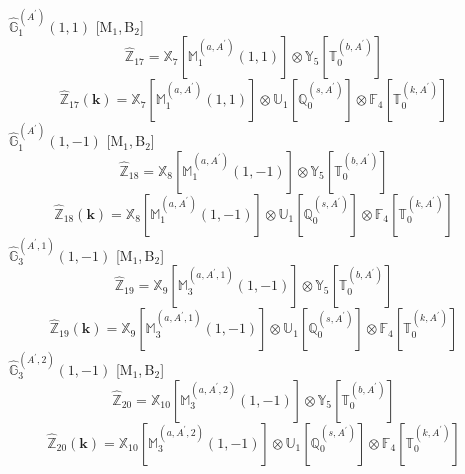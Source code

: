 \documentclass[fleqn,10pt,landscape]{article}
\begin{document}
\begin{itemize}
\begin{dmath*}
\end{dmath*}
\vspace{4mm}
\noindent {} $\,\,\,\hat{\mathbb{G}}_{1}^{(A^{\prime})}(1,1)$ [M$_{1}$,\,B$_{2}$]
\begin{dmath*}
\hat{\mathbb{Z}}_{17}=\mathbb{X}_{7}[\mathbb{M}_{1}^{(a,A^{\prime})}(1,1)] \otimes\mathbb{Y}_{5}[\mathbb{T}_{0}^{(b,A^{\prime})}]
\end{dmath*}
\begin{dmath*}
\hat{\mathbb{Z}}_{17}(\bm{k})=\mathbb{X}_{7}[\mathbb{M}_{1}^{(a,A^{\prime})}(1,1)] \otimes\mathbb{U}_{1}[\mathbb{Q}_{0}^{(s,A^{\prime})}] \otimes\mathbb{F}_{4}[\mathbb{T}_{0}^{(k,A^{\prime})}]
\end{dmath*}
\vspace{4mm}
\noindent {} $\,\,\,\hat{\mathbb{G}}_{1}^{(A^{\prime})}(1,-1)$ [M$_{1}$,\,B$_{2}$]
\begin{dmath*}
\hat{\mathbb{Z}}_{18}=\mathbb{X}_{8}[\mathbb{M}_{1}^{(a,A^{\prime})}(1,-1)] \otimes\mathbb{Y}_{5}[\mathbb{T}_{0}^{(b,A^{\prime})}]
\end{dmath*}
\begin{dmath*}
\hat{\mathbb{Z}}_{18}(\bm{k})=\mathbb{X}_{8}[\mathbb{M}_{1}^{(a,A^{\prime})}(1,-1)] \otimes\mathbb{U}_{1}[\mathbb{Q}_{0}^{(s,A^{\prime})}] \otimes\mathbb{F}_{4}[\mathbb{T}_{0}^{(k,A^{\prime})}]
\end{dmath*}
\vspace{4mm}
\noindent {} $\,\,\,\hat{\mathbb{G}}_{3}^{(A^{\prime},1)}(1,-1)$ [M$_{1}$,\,B$_{2}$]
\begin{dmath*}
\hat{\mathbb{Z}}_{19}=\mathbb{X}_{9}[\mathbb{M}_{3}^{(a,A^{\prime},1)}(1,-1)] \otimes\mathbb{Y}_{5}[\mathbb{T}_{0}^{(b,A^{\prime})}]
\end{dmath*}
\begin{dmath*}
\hat{\mathbb{Z}}_{19}(\bm{k})=\mathbb{X}_{9}[\mathbb{M}_{3}^{(a,A^{\prime},1)}(1,-1)] \otimes\mathbb{U}_{1}[\mathbb{Q}_{0}^{(s,A^{\prime})}] \otimes\mathbb{F}_{4}[\mathbb{T}_{0}^{(k,A^{\prime})}]
\end{dmath*}
\vspace{4mm}
\noindent {} $\,\,\,\hat{\mathbb{G}}_{3}^{(A^{\prime},2)}(1,-1)$ [M$_{1}$,\,B$_{2}$]
\begin{dmath*}
\hat{\mathbb{Z}}_{20}=\mathbb{X}_{10}[\mathbb{M}_{3}^{(a,A^{\prime},2)}(1,-1)] \otimes\mathbb{Y}_{5}[\mathbb{T}_{0}^{(b,A^{\prime})}]
\end{dmath*}
\begin{dmath*}
\hat{\mathbb{Z}}_{20}(\bm{k})=\mathbb{X}_{10}[\mathbb{M}_{3}^{(a,A^{\prime},2)}(1,-1)] \otimes\mathbb{U}_{1}[\mathbb{Q}_{0}^{(s,A^{\prime})}] \otimes\mathbb{F}_{4}[\mathbb{T}_{0}^{(k,A^{\prime})}]

\end{dmath*}
\end{itemize}
\end{document}
